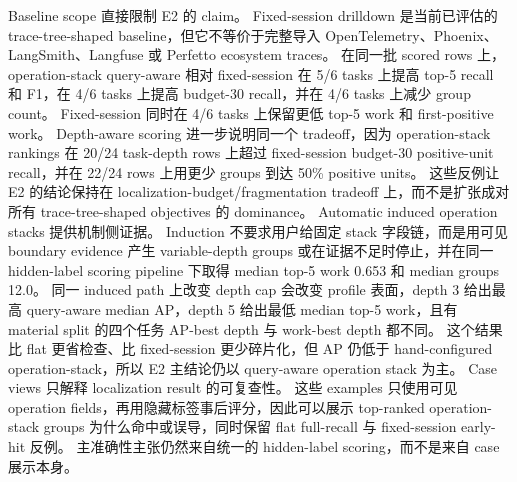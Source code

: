 \documentclass[10pt,twocolumn]{ctexart}
\begin{document}
Baseline scope 直接限制 E2 的 claim。
Fixed-session drilldown 是当前已评估的 trace-tree-shaped baseline，但它不等价于完整导入 OpenTelemetry、Phoenix、LangSmith、Langfuse 或 Perfetto ecosystem traces。
在同一批 scored rows 上，operation-stack query-aware 相对 fixed-session 在 5/6 tasks 上提高 top-5 recall 和 F1，在 4/6 tasks 上提高 budget-30 recall，并在 4/6 tasks 上减少 group count。
Fixed-session 同时在 4/6 tasks 上保留更低 top-5 work 和 first-positive work。
Depth-aware scoring 进一步说明同一个 tradeoff，因为 operation-stack rankings 在 20/24 task-depth rows 上超过 fixed-session budget-30 positive-unit recall，并在 22/24 rows 上用更少 groups 到达 50\% positive units。
这些反例让 E2 的结论保持在 localization-budget/fragmentation tradeoff 上，而不是扩张成对所有 trace-tree-shaped objectives 的 dominance。
Automatic induced operation stacks 提供机制侧证据。
Induction 不要求用户给固定 stack 字段链，而是用可见 boundary evidence 产生 variable-depth groups 或在证据不足时停止，并在同一 hidden-label scoring pipeline 下取得 median top-5 work 0.653 和 median groups 12.0。
同一 induced path 上改变 depth cap 会改变 profile 表面，depth 3 给出最高 query-aware median AP，depth 5 给出最低 median top-5 work，且有 material split 的四个任务 AP-best depth 与 work-best depth 都不同。
这个结果比 flat 更省检查、比 fixed-session 更少碎片化，但 AP 仍低于 hand-configured operation-stack，所以 E2 主结论仍以 query-aware operation stack 为主。
Case views 只解释 localization result 的可复查性。
这些 examples 只使用可见 operation fields，再用隐藏标签事后评分，因此可以展示 top-ranked operation-stack groups 为什么命中或误导，同时保留 flat full-recall 与 fixed-session early-hit 反例。
主准确性主张仍然来自统一的 hidden-label scoring，而不是来自 case 展示本身。
\end{document}
